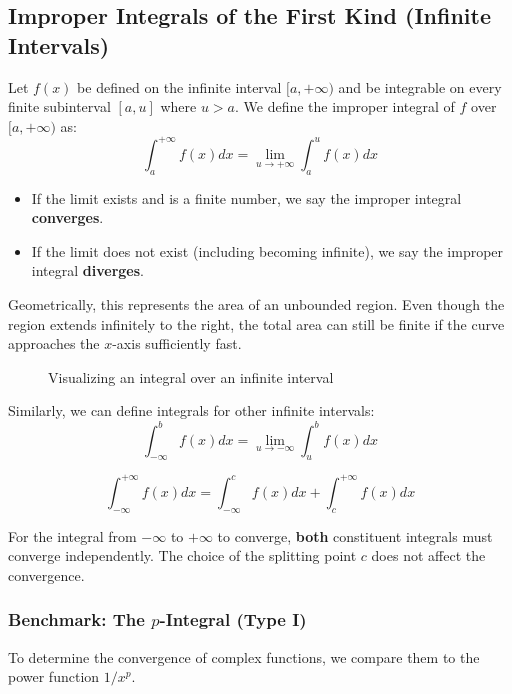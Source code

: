 \subsection{Improper Integrals of the First Kind (Infinite Intervals)}

\begin{definition}
Let $f(x)$ be defined on the infinite interval $[a, +\infty)$ and be integrable on every finite subinterval $[a, u]$ where $u > a$. We define the improper integral of $f$ over $[a, +\infty)$ as:
\[
\int_a^{+\infty} f(x) dx = \lim_{u \to +\infty} \int_a^u f(x) dx
\]

\begin{itemize}
    \item If the limit exists and is a finite number, we say the improper integral \textbf{converges}.
    \item If the limit does not exist (including becoming infinite), we say the improper integral \textbf{diverges}.
\end{itemize}
\end{definition}
Geometrically, this represents the area of an unbounded region. Even though the region extends infinitely to the right, the total area can still be finite if the curve approaches the $x$-axis sufficiently fast.
\begin{figure}[htbp]
\centering
{}
\caption{Visualizing an integral over an infinite interval}
\end{figure}

Similarly, we can define integrals for other infinite intervals:
\[
\int_{-\infty}^b f(x) dx = \lim_{u \to -\infty} \int_u^b f(x) dx
\]

\[
\int_{-\infty}^{+\infty} f(x) dx = \int_{-\infty}^c f(x) dx + \int_c^{+\infty} f(x) dx
\]

For the integral from $-\infty$ to $+\infty$ to converge, \textbf{both} constituent integrals must converge independently. The choice of the splitting point $c$ does not affect the convergence.
\subsubsection{Benchmark: The $p$-Integral (Type I)}
To determine the convergence of complex functions, we compare them to the power function $1/x^p$.

